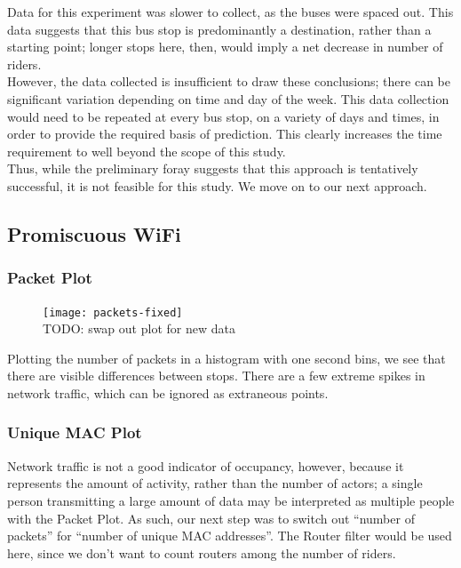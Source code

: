 \documentclass[11pt,journal,compsoc]{IEEEtran} %
\begin{document}
	Data for this experiment was slower to collect, as the buses were spaced out.
	This data suggests that this bus stop is predominantly a destination, rather than a starting point; longer stops here, then, would imply a net decrease in number of riders.
	\\
	However, the data collected is insufficient to draw these conclusions; there can be significant variation depending on time and day of the week.
	This data collection would need to be repeated at every bus stop, on a variety of days and times, in order to provide the required basis of prediction.
	This clearly increases the time requirement to well beyond the scope of this study.
	\\
	Thus, while the preliminary foray suggests that this approach is tentatively successful, it is not feasible for this study.
	We move on to our next approach.

\subsection*{Promiscuous WiFi}
    
	\subsubsection*{Packet Plot}
		\begin{figure}[!t]
		\texttt{[image: packets-fixed]}
		\\TODO: swap out plot for new data
		\end{figure}

		Plotting the number of packets in a histogram with one second bins, we see that there are visible differences between stops. %
		There are a few extreme spikes in network traffic, which can be ignored as extraneous points.

	\subsubsection*{Unique MAC Plot}

		Network traffic is not a good indicator of occupancy, however, because it represents the amount of activity, rather than the number of actors; a single person transmitting a large amount of data may be interpreted as multiple people with the Packet Plot.
		As such, our next step was to switch out ``number of packets'' for ``number of unique MAC addresses''.
		The Router filter would be used here, since we don't want to count routers among the number of riders.
\end{document}
